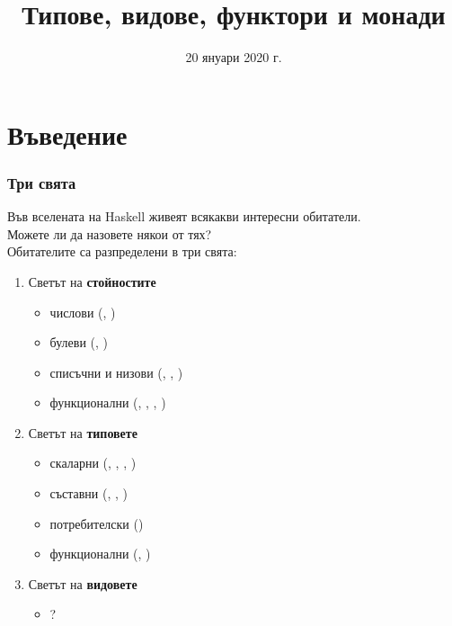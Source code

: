 \documentclass[alsotrans]{beamerswitch}
\title{Типове, видове, функтори и монади}
\date{20 януари 2020 г.}
\begin{document}
\begin{frame}
  \titlepage
\end{frame}

\section{Въведение}

\begin{frame}[fragile]
  \frametitle{Три свята}
  Във вселената на Haskell живеят всякакви интересни обитатели.\\
  Можете ли да назовете някои от тях?\pause\\[2ex]
  Обитателите са разпределени в три свята:\pause
  \begin{enumerate}[<+->]
    \small
  \item Светът на \textbf{стойностите}
    \begin{itemize}
    \item числови (, ) 
    \item булеви (, )
    \item списъчни и низови (\lst{[1, 2, 3]}, , \lst{[]})
    \item функционални (, \lst{(+)}, , )
    \end{itemize}
  \item Светът на \textbf{типовете}
    \begin{itemize}
    \item скаларни (, , , )
    \item съставни (\lst{[Int]}, , \lst{[[Float]]})
    \item потребителски ()
    \item функционални (, )
    \end{itemize}
  \item Светът на \textbf{видовете}
    \begin{itemize}
    \item \alert{?}
    \end{itemize}
  \end{enumerate}
\end{frame}
\end{document}
